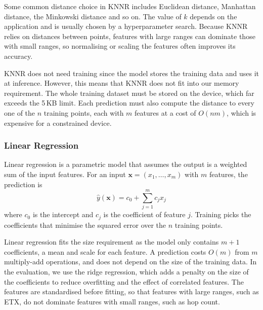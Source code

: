 Some common distance choice in KNNR includes Euclidean distance,
Manhattan distance, the Minkowski
distance and so on. The value of $k$ depends on the
application and is usually chosen by a hyperparameter search. Because
KNNR relies on distances between points, features with large ranges
can dominate those with small ranges, so normalising or scaling the
features often improves its accuracy.

KNNR does not need training since the model stores the training data
and uses it at inference.
However, this means that KNNR does not fit into our memory
requirement. The whole
training dataset must be stored on the device, which far exceeds the
5\,KB limit. Each prediction must also compute the distance to every
one of the $n$ training points, each with $m$ features at a cost of
$O(nm)$, which is
expensive for a constrained device.

\subsubsection{Linear Regression}
Linear regression is a parametric model that assumes the output is a
weighted sum of the input features. For an input
$\mathbf{x} = (x_1, \dots, x_m)$ with $m$ features, the prediction is
\begin{equation}
    \hat{y}(\mathbf{x}) = c_0 + \sum_{j=1}^{m} c_j x_j
\end{equation}
where $c_0$ is the intercept and $c_j$ is the coefficient of
feature $j$. Training picks the coefficients that minimise the squared
error over the $n$ training points.

Linear regression fits the size requirement as
the model only contains $m+1$ coefficients, a mean and scale for each
feature. A prediction costs $O(m)$ from $m$ multiply-add operations, and
does not depend on the size of the training data. In the evaluation, we use the
ridge regression, which adds a penalty on the
size of the coefficients to reduce overfitting and the effect of
correlated features. The features are standardised before fitting,
so that features with large ranges, such as ETX, do not dominate
features with small ranges, such as hop count.

